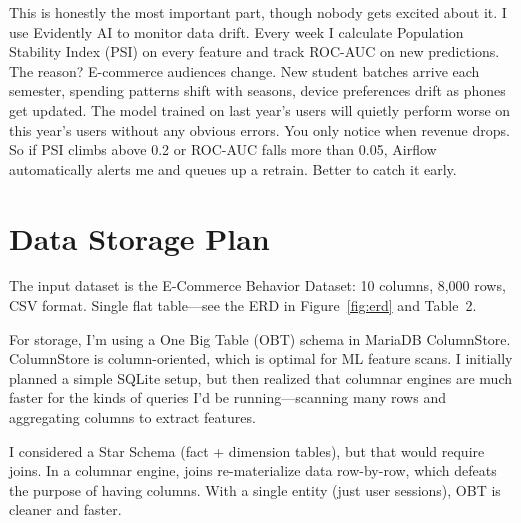 \documentclass[11pt,a4paper]{article}
\begin{document}
This is honestly the most important part, though nobody gets excited about it. I use Evidently AI 
to monitor data drift. Every week I calculate Population Stability Index (PSI) on every feature 
and track ROC-AUC on new predictions. The reason? E-commerce audiences change. New student batches 
arrive each semester, spending patterns shift with seasons, device preferences drift as phones 
get updated. The model trained on last year's users will quietly perform worse on this year's users 
without any obvious errors. You only notice when revenue drops. So if PSI climbs above 0.2 or 
ROC-AUC falls more than 0.05, Airflow automatically alerts me and queues up a retrain. Better 
to catch it early.

\newpage

\section{Data Storage Plan}

The input dataset is the E-Commerce Behavior Dataset: 10 columns, 8,000 rows, CSV format. 
Single flat table—see the ERD in Figure~\ref{fig:erd} and Table~2.

For storage, I'm using a One Big Table (OBT) schema in MariaDB ColumnStore. ColumnStore is 
column-oriented, which is optimal for ML feature scans. I initially planned a simple SQLite 
setup, but then realized that columnar engines are much faster for the kinds of queries I'd 
be running—scanning many rows and aggregating columns to extract features.

I considered a Star Schema (fact + dimension tables), but that would require joins. In a 
columnar engine, joins re-materialize data row-by-row, which defeats the purpose of having 
columns. With a single entity (just user sessions), OBT is cleaner and faster.
\end{document}
